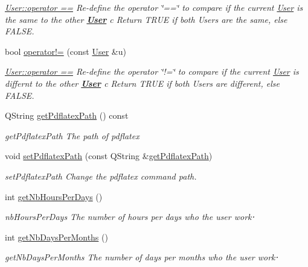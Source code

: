 \begin{DoxyCompactItemize}
\begin{DoxyCompactList}\small\item\em \hyperlink{classModels_1_1User_a60d18c2d1df053f1abf1215414f0b4b6}{User\+::operator ==} Re-\/define the operator \char`\"{}==\char`\"{} to compare if the current \hyperlink{classModels_1_1User}{User} is the same to the other {\bfseries \hyperlink{classModels_1_1User}{User}} {\itshape c} Return T\+R\+U\+E if both Users are the same, else F\+A\+L\+S\+E. \end{DoxyCompactList}\item 
bool \hyperlink{classModels_1_1User_aa1cdb1f752173aedd5f0c43edcb0b10b}{operator!=} (const \hyperlink{classModels_1_1User}{User} \&u)
\begin{DoxyCompactList}\small\item\em \hyperlink{classModels_1_1User_a60d18c2d1df053f1abf1215414f0b4b6}{User\+::operator ==} Re-\/define the operator \char`\"{}!=\char`\"{} to compare if the current \hyperlink{classModels_1_1User}{User} is differnt to the other {\bfseries \hyperlink{classModels_1_1User}{User}} {\itshape c} Return T\+R\+U\+E if both Users are different, else F\+A\+L\+S\+E. \end{DoxyCompactList}\item 
Q\+String \hyperlink{classModels_1_1User_ae8a894050c3e9266518707f6e5cd1c2f}{get\+Pdflatex\+Path} () const 
\begin{DoxyCompactList}\small\item\em get\+Pdflatex\+Path The path of pdflatex \end{DoxyCompactList}\item 
void \hyperlink{classModels_1_1User_ac65a44513c34f7e67888062d8bee3e54}{set\+Pdflatex\+Path} (const Q\+String \&\hyperlink{classModels_1_1User_ae8a894050c3e9266518707f6e5cd1c2f}{get\+Pdflatex\+Path})
\begin{DoxyCompactList}\small\item\em set\+Pdflatex\+Path Change the pdflatex command path. \end{DoxyCompactList}\item 
int \hyperlink{classModels_1_1User_acb46d721cae3c0a9059de32da0c33eaa}{get\+Nb\+Hours\+Per\+Days} ()
\begin{DoxyCompactList}\small\item\em nb\+Hours\+Per\+Days The number of hours per days who the user work⋅ \end{DoxyCompactList}\item 
int \hyperlink{classModels_1_1User_a1ec672f16a5dbb248e05f2e957094c4d}{get\+Nb\+Days\+Per\+Months} ()
\begin{DoxyCompactList}\small\item\em get\+Nb\+Days\+Per\+Months The number of days per months who the user work⋅ \end{DoxyCompactList}\end{DoxyCompactItemize}
